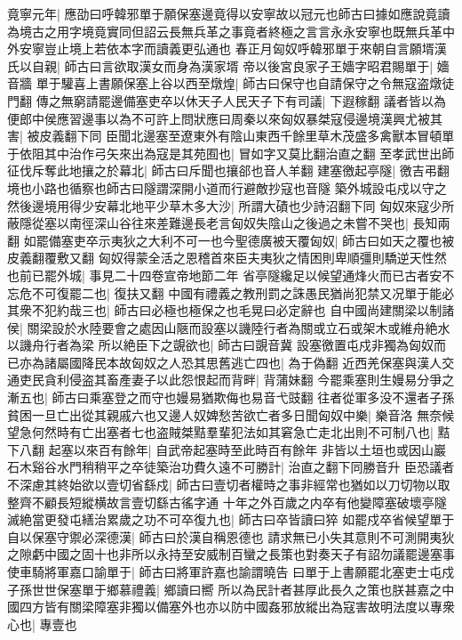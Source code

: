 竟寧元年|{
	應劭曰呼韓邪單于願保塞邊竟得以安寧故以冠元也師古曰據如應說竟讀為境古之用字境竟實同但詔云長無兵革之事竟者終極之言言永永安寧也既無兵革中外安寧豈止境上若依本字而讀義更弘通也}
春正月匈奴呼韓邪單于來朝自言願壻漢氏以自親|{
	師古曰言欲取漢女而身為漢家壻}
帝以後宮良家子王嬙字昭君賜單于|{
	嬙音牆}
單于驩喜上書願保塞上谷以西至燉煌|{
	師古曰保守也自請保守之令無寇盗燉徒門翻}
傳之無窮請罷邊備塞吏卒以休天子人民天子下有司議|{
	下遐稼翻}
議者皆以為便郎中侯應習邊事以為不可許上問狀應曰周秦以來匈奴暴桀寇侵邊境漢興尤被其害|{
	被皮義翻下同}
臣聞北邊塞至遼東外有陰山東西千餘里草木茂盛多禽獸本冒頓單于依阻其中治作弓矢來出為寇是其苑囿也|{
	冒如字又莫比翻治直之翻}
至孝武世出師征伐斥奪此地攘之於幕北|{
	師古曰斥聞也攘郤也音人羊翻}
建塞徼起亭隧|{
	徼吉弔翻境也小路也循察也師古曰隧謂深開小道而行避敵抄寇也音隧}
築外城設屯戍以守之然後邊境用得少安幕北地平少草木多大沙|{
	所謂大磧也少詩沼翻下同}
匈奴來寇少所蔽隱從塞以南徑深山谷往來差難邊長老言匈奴失陰山之後過之未嘗不哭也|{
	長知兩翻}
如罷備塞吏卒示夷狄之大利不可一也今聖德廣被天覆匈奴|{
	師古曰如天之覆也被皮義翻覆敷又翻}
匈奴得蒙全活之恩稽首來臣夫夷狄之情困則卑順彊則驕逆天性然也前已罷外城|{
	事見二十四卷宣帝地節二年}
省亭隧纔足以候望通烽火而已古者安不忘危不可復罷二也|{
	復扶又翻}
中國有禮義之教刑罰之誅愚民猶尚犯禁又况單于能必其衆不犯約哉三也|{
	師古曰必極也極保之也毛晃曰必定辭也}
自中國尚建關梁以制諸侯|{
	關梁設於水陸要會之處因山陿而設塞以譏陸行者為關或立石或架木或維舟絶水以譏舟行者為梁}
所以絶臣下之覬欲也|{
	師古曰覬音冀}
設塞徼置屯戍非獨為匈奴而已亦為諸屬國降民本故匈奴之人恐其思舊逃亡四也|{
	為于偽翻}
近西羌保塞與漢人交通吏民貪利侵盗其畜產妻子以此怨恨起而背畔|{
	背蒲妹翻}
今罷乘塞則生嫚易分爭之漸五也|{
	師古曰乘塞登之而守也嫚易猶欺侮也易音弋豉翻}
往者從軍多没不還者子孫貧困一旦亡出從其親戚六也又邊人奴婢愁苦欲亡者多日聞匈奴中樂|{
	樂音洛}
無奈候望急何然時有亡出塞者七也盗賊桀黠羣輩犯法如其窘急亡走北出則不可制八也|{
	黠下八翻}
起塞以來百有餘年|{
	自武帝起塞時至此時百有餘年}
非皆以土垣也或因山巖石木谿谷水門稍稍平之卒徒築治功費久遠不可勝計|{
	治直之翻下同勝音升}
臣恐議者不深慮其終始欲以壹切省繇戍|{
	師古曰壹切者權時之事非經常也猶如以刀切物以取整齊不顧長短縱横故言壹切繇古徭字通}
十年之外百歲之内卒有他變障塞破壞亭隧滅絶當更發屯繕治累歲之功不可卒復九也|{
	師古曰卒皆讀曰猝}
如罷戍卒省候望單于自以保塞守禦必深德漢|{
	師古曰於漢自稱恩德也}
請求無已小失其意則不可測開夷狄之隙虧中國之固十也非所以永持至安威制百蠻之長策也對奏天子有詔勿議罷邊塞事使車騎將軍嘉口諭單于|{
	師古曰將軍許嘉也諭謂曉告}
曰單于上書願罷北塞吏士屯戍子孫世世保塞單于鄉慕禮義|{
	鄉讀曰嚮}
所以為民計者甚厚此長久之策也朕甚嘉之中國四方皆有關梁障塞非獨以備塞外也亦以防中國姦邪放縱出為寇害故明法度以專衆心也|{
	專壹也}
